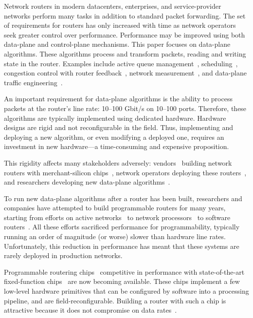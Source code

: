 Network routers in modern datacenters, enterprises, and service-provider
networks perform many tasks in addition to standard packet forwarding. The set
of requirements for routers has only increased with time as network operators
seek greater control over performance.  Performance may be improved using both
data-plane and control-plane mechanisms. This paper focuses on data-plane
algorithms. These algorithms process and transform packets, reading and
writing state in the router. Examples include active queue
management~\cite{red,avq,codel}, scheduling~\cite{pifo_sigcomm}, congestion
control with router feedback~\cite{xcp, rcp}, network
measurement~\cite{opensketch, bitmap_george}, and data-plane traffic
engineering~\cite{conga}.

An important requirement for data-plane algorithms is the ability to process
packets at the router's line rate: 10--100 Gbit/s on 10--100 ports.  Therefore,
these algorithms are typically implemented using dedicated hardware.  Hardware
designs are rigid and not reconfigurable in the field. Thus, implementing and
deploying a new algorithm, or even modifying a deployed one, requires an
investment in new hardware---a time-consuming and expensive proposition.

This rigidity affects many stakeholders adversely: vendors~\cite{arista_7050, cisco_nexus,
dell_force10} building network routers with merchant-silicon
chips~\cite{trident, tomahawk, mellanox}, network operators deploying these
routers~\cite{vl2, facebook, google}, and researchers developing new data-plane
algorithms~\cite{conga, bitmap_george, xcp, rcp}.

To run new data-plane algorithms after a router has been built, researchers and
companies have attempted to build programmable routers for many years,
starting from efforts on active networks~\cite{active-nets} to network
processors~\cite{ixp4xx} to software routers~\cite{dpdk, click}. All these
efforts sacrificed performance for programmability, typically running an order
of magnitude (or worse) slower than hardware line rates. Unfortunately, this
reduction in performance has meant that these systems are rarely deployed in
production networks.

Programmable routering chips~\cite{tofino, flexpipe, xpliant} competitive in
performance with state-of-the-art fixed-function chips~\cite{trident,
tomahawk, mellanox} are now becoming available. These chips implement a few
low-level hardware primitives that can be configured by software into a
processing pipeline, and are field-reconfigurable. Building a router with such
a chip is attractive because it does not compromise on data rates~\cite{rmt}.

